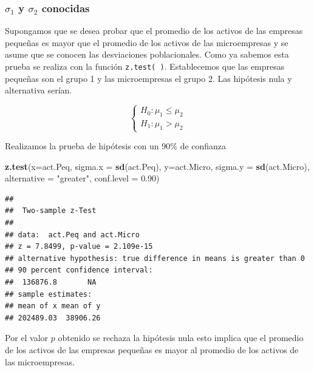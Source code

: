 \documentclass[letterpaper,]{book}
\newenvironment{Shaded}{\begin{snugshade}}{\end{snugshade}}
\newcommand{\DataTypeTok}[1]{\textcolor[rgb]{0.13,0.29,0.53}{#1}}
\newcommand{\FloatTok}[1]{\textcolor[rgb]{0.00,0.00,0.81}{#1}}
\newcommand{\KeywordTok}[1]{\textcolor[rgb]{0.13,0.29,0.53}{\textbf{#1}}}
\newcommand{\NormalTok}[1]{#1}
\newcommand{\StringTok}[1]{\textcolor[rgb]{0.31,0.60,0.02}{#1}}
\begin{document}
\hypertarget{sigma_1-y-sigma_2-conocidas-1}{%
\subsubsection{\texorpdfstring{\(\sigma_1\) y \(\sigma_2\) conocidas}{\textbackslash{}sigma\_1 y \textbackslash{}sigma\_2 conocidas}}\label{sigma_1-y-sigma_2-conocidas-1}}

Supongamos que se desea probar que el promedio de los activos de las empresas pequeñas es mayor que el promedio de los activos de las microempresas y se asume que se conocen las desviaciones poblacionales. Como ya sabemos esta prueba se realiza con la función \texttt{z.test(\ )}. Establecemos que las empresas pequeñas son el grupo 1 y las microempresas el grupo 2. Las hipótesis nula y alternativa serían.

\begin{equation} 
\begin{cases} 
H_0: \mu_1 \leq \mu_2 \\ 
H_1: \mu_1 > \mu_2
\end{cases} 
\end{equation}

Realizamos la prueba de hipótesis con un \(90\%\) de confianza

\begin{Shaded}
\begin{Highlighting}[]
\KeywordTok{z.test}\NormalTok{(}\DataTypeTok{x=}\NormalTok{act.Peq, }\DataTypeTok{sigma.x =} \KeywordTok{sd}\NormalTok{(act.Peq), }
       \DataTypeTok{y=}\NormalTok{act.Micro, }\DataTypeTok{sigma.y =} \KeywordTok{sd}\NormalTok{(act.Micro),}
       \DataTypeTok{alternative =} \StringTok{"greater"}\NormalTok{, }\DataTypeTok{conf.level =} \FloatTok{0.90}\NormalTok{)}
\end{Highlighting}
\end{Shaded}

\begin{verbatim}
## 
##  Two-sample z-Test
## 
## data:  act.Peq and act.Micro
## z = 7.8499, p-value = 2.109e-15
## alternative hypothesis: true difference in means is greater than 0
## 90 percent confidence interval:
##  136876.8       NA
## sample estimates:
## mean of x mean of y 
## 202489.03  38906.26
\end{verbatim}

Por el valor \(p\) obtenido se rechaza la hipótesis nula esto implica que el promedio de los activos de las empresas pequeñas es mayor al promedio de los activos de las microempresas.
\end{document}
